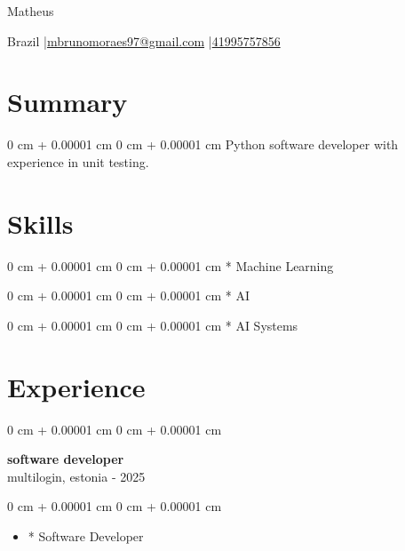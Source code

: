 \documentclass[10pt, letterpaper]{article}
\newenvironment{highlights}{
    \begin{itemize}[
        topsep=0.10 cm,
        parsep=0.10 cm,
        partopsep=0pt,
        itemsep=0pt,
        leftmargin=0 cm + 10pt
    ]
}{
    \end{itemize}
}
\newenvironment{onecolentry}{
    \begin{adjustwidth}{
        0 cm + 0.00001 cm
    }{
        0 cm + 0.00001 cm
    }
}{
    \end{adjustwidth}
}
\newenvironment{header}{
    \setlength{\topsep}{0pt}\par\kern\topsep\centering\linespread{1.5}
}{
    \par\kern\topsep
}
\begin{document}
\begin{header}
    {\fontsize{25pt}{25pt}\selectfont Matheus}

    \vspace{0pt}

    \normalsize
    \mbox{Brazil} \enskip|\enskip \mbox{\href{mailto:mbrunomoraes97@gmail.com}{mbrunomoraes97@gmail.com}} \enskip|\enskip \mbox{\href{tel:41995757856}{41995757856}} \\
    
\end{header}

\vspace{5pt - 0.1cm}

\section{Summary}
\begin{onecolentry}{Python software developer with experience in unit testing.}\end{onecolentry}
\section{Skills}
\begin{onecolentry}{* Machine Learning}\end{onecolentry}
\vspace{0.2cm}
\begin{onecolentry}{* AI}\end{onecolentry}
\vspace{0.2cm}
\begin{onecolentry}{* AI Systems}\end{onecolentry}
\section{Experience}

\begin{onecolentry}
    \setcolumnwidth{\fill, 4.5cm}
    \begin{paracol}{2}
        \textbf{software developer} \\ multilogin, estonia
        \switchcolumn
         - 2025
    \end{paracol}
\end{onecolentry}
\vspace{0.10cm}
\begin{onecolentry}
    \begin{highlights}
                \item * Software Developer
    \end{highlights}
\end{onecolentry}
\end{document}
